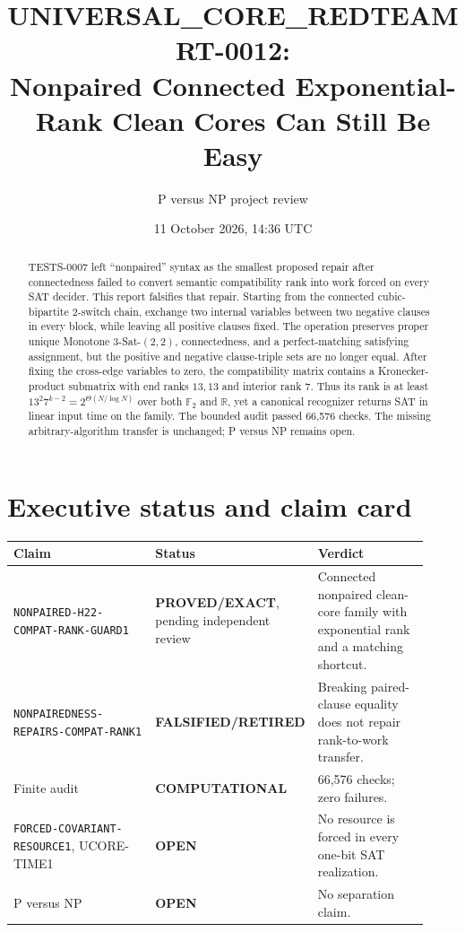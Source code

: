 \documentclass[11pt]{article}
\title{UNIVERSAL\_CORE\_REDTEAM RT-0012:\\
Nonpaired Connected Exponential-Rank Clean Cores Can Still Be Easy}
\author{P versus NP project review}
\date{11 October 2026, 14:36 UTC}
\newcommand{\EXACT}{\textbf{PROVED/EXACT}}
\newcommand{\OPEN}{\textbf{OPEN}}
\newcommand{\RETIRED}{\textbf{FALSIFIED/RETIRED}}
\newcommand{\COMP}{\textbf{COMPUTATIONAL}}
\begin{document}
\maketitle

\begin{abstract}
TESTS-0007 left ``nonpaired'' syntax as the smallest proposed repair after
connectedness failed to convert semantic compatibility rank into work forced
on every SAT decider.  This report falsifies that repair.  Starting from the
connected cubic-bipartite 2-switch chain, exchange two internal variables
between two negative clauses in every block, while leaving all positive
clauses fixed.  The operation preserves proper unique Monotone
3-Sat-$(2,2)$, connectedness, and a perfect-matching satisfying assignment,
but the positive and negative clause-triple sets are no longer equal.  After
fixing the cross-edge variables to zero, the compatibility matrix contains a
Kronecker-product submatrix with end ranks $13,13$ and interior rank $7$.
Thus its rank is at least
$13^2 7^{k-2}=2^{\Theta(N/\log N)}$ over both $\mathbb F_2$ and $\mathbb R$,
yet a canonical recognizer returns SAT in linear input time on the family.
The bounded audit passed 66,576 checks.  The missing arbitrary-algorithm
transfer is unchanged; P versus NP remains open.
\end{abstract}

\section{Executive status and claim card}

\begin{center}
\small
\begin{tabular}{@{}p{0.40\linewidth}p{0.20\linewidth}p{0.32\linewidth}@{}}
\toprule
Claim & Status & Verdict\\
\midrule
\texttt{NONPAIRED-H22-COMPAT-RANK-GUARD1} & \EXACT, pending independent review &
Connected nonpaired clean-core family with exponential rank and a matching shortcut.\\
\texttt{NONPAIREDNESS-REPAIRS-COMPAT-RANK1} & \RETIRED &
Breaking paired-clause equality does not repair rank-to-work transfer.\\
Finite audit & \COMP & 66,576 checks; zero failures.\\
\texttt{FORCED-COVARIANT-RESOURCE1}, UCORE-TIME1 & \OPEN &
No resource is forced in every one-bit SAT realization.\\
P versus NP & \OPEN & No separation claim.\\
\bottomrule
\end{tabular}
\end{center}
\end{document}

